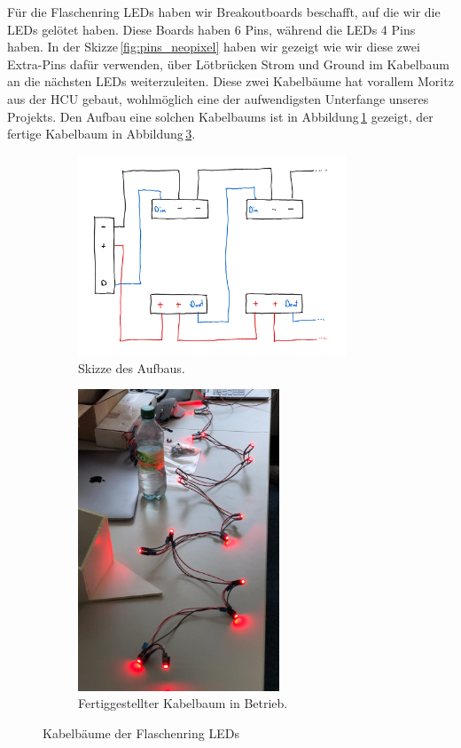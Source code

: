             Für die Flaschenring LEDs haben wir Breakoutboards beschafft, auf die wir die LEDs gelötet haben. Diese Boards haben 6 Pins, während die LEDs 4 Pins haben. In der Skizze\,\ref{fig:pins_neopixel} haben wir gezeigt wie wir diese zwei Extra-Pins dafür verwenden, über Lötbrücken Strom und Ground im Kabelbaum an die nächsten LEDs weiterzuleiten. Diese zwei Kabelbäume hat vorallem Moritz aus der HCU gebaut, wohlmöglich eine der aufwendigsten Unterfange unseres Projekts. Den Aufbau eine solchen Kabelbaums ist in Abbildung\,\ref{fig:led_wiring_1} gezeigt, der fertige Kabelbaum in Abbildung\,\ref{fig:picture_bottle_leds}.

            \begin{figure}[H]
                \begin{subfigure}[b]{0.5\textwidth}
                    \centering\includegraphics[width=8cm]{media/03_technical_implementation/leds_1.png}
                    \caption{Skizze des Aufbaus.}
                    \label{fig:led_wiring_1}
                \end{subfigure}\quad
                \begin{subfigure}[b]{0.5\textwidth}
                    \centering\includegraphics[width=6cm]{media/03_technical_implementation/picture_bottle_leds.jpg}
                    \caption{Fertiggestellter Kabelbaum in Betrieb.}
                    \label{fig:picture_bottle_leds}
                \end{subfigure}
                \caption{Kabelbäume der Flaschenring LEDs}
            \end{figure}

